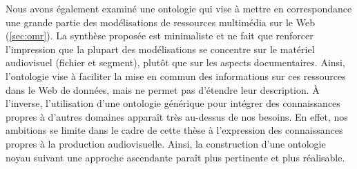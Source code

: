 Nous avons également examiné une ontologie qui vise à mettre en correspondance une grande partie des modélisations de ressources multimédia sur le Web (\ref{sec:omr}).
La synthèse proposée est minimaliste et ne fait que renforcer l'impression que la plupart des modélisations se concentre sur le matériel audiovisuel (fichier et segment), plutôt que sur les aspects documentaires. 
Ainsi, l'ontologie vise à faciliter la mise en commun des informations sur ces ressources dans le Web de données, mais ne permet pas d'étendre leur description.
À l'inverse, l'utilisation d'une ontologie générique pour intégrer des connaissances propres à d'autres domaines apparaît très au-dessus de nos besoins. 
En effet, nos ambitions se limite dans le cadre de cette thèse à l'expression des connaissances propres à la production audiovisuelle.
Ainsi, la construction d'une ontologie noyau suivant une approche ascendante paraît plus pertinente et plus réalisable.\\









